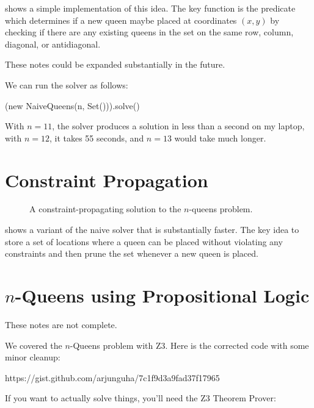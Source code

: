 \documentclass[9pt]{extbook}
\begin{document}
 shows a simple implementation of this idea. The key function
is the  predicate which determines if a new queen
maybe placed at coordinates $(x,y)$ by checking if there are any existing
queens in the set  on the same row, column, diagonal,
or antidiagonal.

\begin{instructor}
These notes could be expanded substantially in the future.
\end{instructor}

We can run the solver as follows:

\begin{scalacode}
(new NaiveQueens(n, Set())).solve()
\end{scalacode}
With $n = 11$, the solver produces a solution in less than a second on my
laptop, with $n = 12$, it takes 55 seconds, and $n = 13$ would take much longer.

\section{Constraint Propagation}

\begin{figure}
\caption{A constraint-propagating solution to the $n$-queens problem.}
\label{OptQueens}
\end{figure}

 shows a variant of the naive solver that is substantially
faster. The key idea to store a set of locations where a queen can be placed
without violating any constraints and then prune the set whenever a new queen
is placed.


\newlecture

\section{$n$-Queens using Propositional Logic}

\begin{instructor}
These notes are not complete.
\end{instructor}

We covered the $n$-Queens problem with Z3.
Here is the corrected code with some minor cleanup:
 
https://gist.github.com/arjunguha/7c1f9d3a9fad37f17965
 
If you want to actually solve things, you'll need the Z3 Theorem Prover:
 
\end{document}
